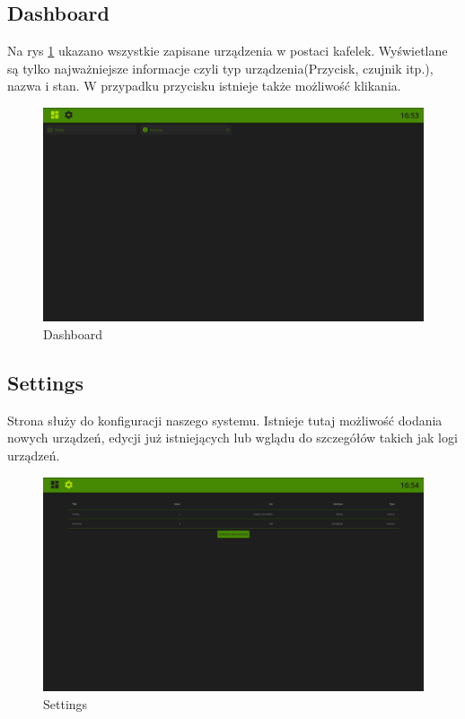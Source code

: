 \subsection{Dashboard}
Na rys \ref{fig:dashboard} ukazano wszystkie zapisane urządzenia w postaci kafelek. Wyświetlane są tylko najważniejsze informacje czyli typ urządzenia(Przycisk, czujnik itp.), nazwa i stan. W przypadku przycisku istnieje także możliwość klikania. 
\begin{figure}[h]
  \includegraphics[width=\linewidth]{dashboard.png}
  \caption{Dashboard}
  \label{fig:dashboard}
\end{figure}
\newpage

\subsection{Settings}
Strona służy do konfiguracji naszego systemu. Istnieje tutaj możliwość dodania nowych urządzeń, edycji już istniejących lub wglądu do szczegółów takich jak logi urządzeń.
\begin{figure}[h!]
  \includegraphics[width=\linewidth]{settings.png}
  \caption{Settings}
  \label{fig:settings}
\end{figure}
\newpage
